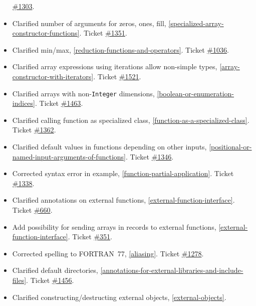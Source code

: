 \begin{itemize}
  \href{https://github.com/modelica/ModelicaSpecification/issues/1303}{\#1303}.
\item
  Clarified number of arguments for zeros, ones, fill, \cref{specialized-array-constructor-functions}.
  Ticket \href{https://github.com/modelica/ModelicaSpecification/issues/1351}{\#1351}.
\item
  Clarified min/max, \cref{reduction-functions-and-operators}. Ticket
  \href{https://github.com/modelica/ModelicaSpecification/issues/1036}{\#1036}.
\item
  Clarified array expressions using iterations allow non-simple types,
  \cref{array-constructor-with-iterators}. Ticket
  \href{https://github.com/modelica/ModelicaSpecification/issues/1521}{\#1521}.
\item
  Clarified arrays with non-\lstinline!Integer! dimensions, \cref{boolean-or-enumeration-indices}.
  Ticket \href{https://github.com/modelica/ModelicaSpecification/issues/1463}{\#1463}.
\item
  Clarified calling function as specialized class, \cref{function-as-a-specialized-class}. Ticket
  \href{https://github.com/modelica/ModelicaSpecification/issues/1362}{\#1362}.
\item
  Clarified default values in functions depending on other inputs,
  \cref{positional-or-named-input-arguments-of-functions}. Ticket
  \href{https://github.com/modelica/ModelicaSpecification/issues/1346}{\#1346}.
\item
  Corrected syntax error in example, \cref{function-partial-application}. Ticket
  \href{https://github.com/modelica/ModelicaSpecification/issues/1338}{\#1338}.
\item
  Clarified annotations on external functions, \cref{external-function-interface}. Ticket
  \href{https://github.com/modelica/ModelicaSpecification/issues/660}{\#660}.
\item
  Add possibility for sending arrays in records to external functions,
  \cref{external-function-interface}. Ticket
  \href{https://github.com/modelica/ModelicaSpecification/issues/351}{\#351}.
\item
  Corrected spelling to FORTRAN~77, \cref{aliasing}. Ticket
  \href{https://github.com/modelica/ModelicaSpecification/issues/1278}{\#1278}.
\item
  Clarified default directories, \cref{annotations-for-external-libraries-and-include-files}. Ticket
  \href{https://github.com/modelica/ModelicaSpecification/issues/1456}{\#1456}.
\item
  Clarified constructing/destructing external objects, \cref{external-objects}.

\end{itemize}
